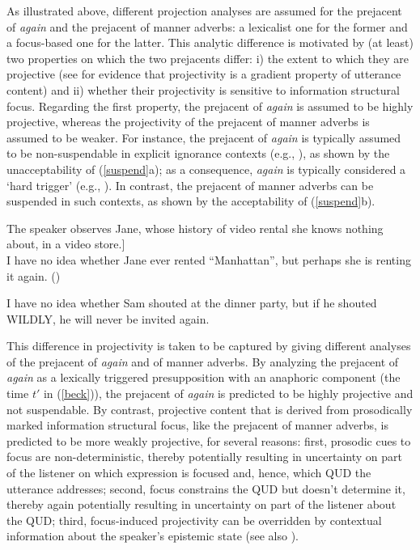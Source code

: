\documentclass[a4paper,12pt]{article}
\def\infelic{{\leavevmode\llap{\#}}}
\newcommand{\6}{\mbox{$[\hspace*{-.6mm}[$}}
\newcommand{\9}{\mbox{$]\hspace*{-.6mm}]$}}
\begin{document}
As illustrated above, different projection analyses are assumed for the prejacent of {\em again} and the prejacent of manner adverbs: a lexicalist one for the former and a focus-based one for the latter. This analytic difference is motivated by (at least) two properties on which the two prejacents differ: i) the extent to which they are projective (see \citealt*{tbd-variability} for evidence that projectivity is a gradient property of utterance content) and ii) whether their projectivity is sensitive to information structural focus. Regarding the first property, the prejacent of {\em again} is assumed to be highly projective, whereas the projectivity of the prejacent of manner adverbs is assumed to be weaker. For instance, the prejacent of {\em again} is typically assumed to be non-suspendable in explicit ignorance contexts (e.g., \citealt{simons01,abrusan2016}), as shown by the unacceptability of  (\ref{suspend}a); as a consequence, {\em again} is typically considered a `hard trigger' (e.g., \citealt{simons01,abusch10,abrusan2016}). In contrast, the prejacent of manner adverbs can be suspended in such contexts, as shown by the acceptability of (\ref{suspend}b). 

\begin{exe}
\ex\label{suspend} 
\begin{xlist}
\ex {[}The speaker observes Jane, whose history of video rental she knows nothing about, in a video store.] \\ \infelic I have no idea whether Jane ever rented ``Manhattan'', but perhaps she is renting it again. \hfill (\citealt[433]{simons01})

\ex I have no idea whether Sam shouted at the dinner party, but if he shouted WILDLY, he will never be invited again.

\end{xlist}


\end{exe}
This difference in projectivity is taken to be captured by giving different analyses of the prejacent of {\em again} and of manner adverbs. By analyzing the prejacent of {\em again} as a lexically triggered presupposition with an anaphoric component (the time $t'$ in (\ref{beck})), the prejacent of {\em again} is predicted to be highly projective and not suspendable. By contrast, projective content that is derived from prosodically marked information structural focus, like the prejacent of manner adverbs, is predicted to be more weakly projective, for several reasons: first, prosodic cues to focus are non-deterministic, thereby potentially resulting in uncertainty on part of the listener on which expression is focused and, hence, which QUD the utterance addresses; second, focus constrains the QUD but doesn't determine it, thereby again potentially resulting in uncertainty on part of the listener about the QUD; third, focus-induced projectivity can be overridden by  contextual information about the speaker's epistemic state (see also \citealt{abrusan2011}).
\end{document}
